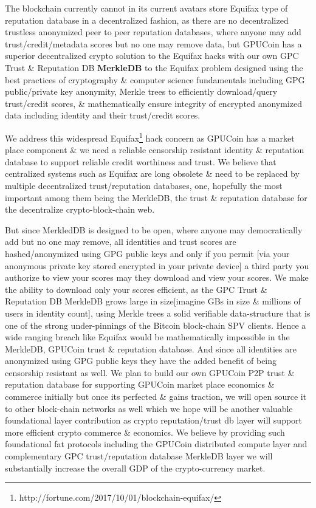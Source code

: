 The blockchain currently cannot in its current avatars store Equifax type of reputation database in a decentralized fashion, as there are no decentralized trustless anonymized peer to peer reputation databases, where anyone may add trust/credit/metadata scores but no one may remove data, but GPUCoin has a superior decentralized crypto solution to the Equifax hacks with our own GPC Trust \& Reputation DB \textbf{MerkleDB} to the Equifax problem designed using the best practices of cryptography \& computer science fundamentals including GPG public/private key anonymity, Merkle trees to efficiently download/query trust/credit scores, \& mathematically ensure integrity of encrypted anonymized data including identity and their trust/credit scores.

We address this widespread Equifax\footnote{http://fortune.com/2017/10/01/blockchain-equifax/} hack concern as GPUCoin has a market place component \& we need a reliable censorship resistant identity \& reputation database to support reliable credit worthiness and trust. We believe that centralized systems such as Equifax are long obsolete \& need to be replaced by multiple decentralized trust/reputation databases, one, hopefully the most important among them being the MerkleDB, the trust \& reputation database for the decentralize crypto-block-chain web. 

But since MerkledDB is designed to be open, where anyone may democratically add but no one may remove, all identities and trust scores are hashed/anonymized using GPG public keys and only if you permit [via your anonymous private key stored encrypted in your private device] a third party you authorize to view your scores may they download and view your scores. We make the ability to download only your scores efficient, as the GPC Trust \& Reputation DB MerkleDB grows large in size[imagine GBs in size \& millions of users in identity count], using Merkle trees a solid verifiable data-structure that is one of the strong under-pinnings of the Bitcoin block-chain SPV clients. Hence a wide ranging breach like Equifax would be mathematically impossible in the MerkleDB, GPUCoin trust \& reputation database.
And since all identities are anonymized using GPG public keys they have the added benefit of being censorship resistant as well. We plan to build our own GPUCoin P2P trust \& reputation database for supporting GPUCoin market place economics \& commerce initially but once its perfected \& gains traction, we will open source it to other block-chain networks as well which we hope will be another valuable foundational layer contribution as crypto reputation/trust db layer will support more efficient crypto commerce \& economics. We believe by providing such foundational fat protocols including the GPUCoin distributed compute layer and complementary GPC trust/reputation database MerkleDB layer we will substantially increase the overall GDP of the crypto-currency market.
